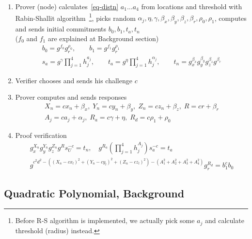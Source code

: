 \documentclass{article}
\begin{document}
\begin{enumerate}
	\item
	Prover (node) calculates~\eqref{eq-distn} $a_1 \dots a_4$ from locations and threshold
	with Rabin-Shallit algorithm~\footnote{Before R-S algorithm is implemented,
		we actually pick some $a_j$ and calculate threshold (radius) instead.},
	picks random $\alpha_j, \eta, \gamma, \beta_x, \beta_y, \beta_z, \beta_r, \rho_0, \rho_1$, %
	computes and sends initial commitments $b_0, b_1, t_a, t_n$ \\
	($f_0$ and $f_1$ are explained at Background section)
	\begin{gather}
	b_0 = g^{f_0} g_r^{\rho_0},   \qquad
	b_1 = g^{f_1} g_r^{\rho_1}    \\
	s_a = g^{\gamma} \prod_{j=1}^4 h_j^{a_j},   \qquad
	t_a = g^{\eta} \prod_{j=1}^4 h_j^{\alpha_j} ,   \qquad
	t_n = g_x^{\beta_x} g_y^{\beta_y} g_z^{\beta_z} g^{\beta_r}
	\end{gather}
	
	\item
	Verifier chooses and sends his challenge $c$
	\item
	Prover computes and sends responses
	\begin{gather}
	X_n = c x_n + \beta_x,  \;
	Y_n = c y_n + \beta_y,  \;
	Z_n = c z_n + \beta_z,   \;
	R = c r + \beta_r   \\
	A_j = c a_j + \alpha_j, \;
	R_a = c \gamma + \eta,   \;
	R_d = c \rho_1 + \rho_0
	\end{gather}
	
	\item
	Proof verification
	\begin{gather}
	\label{verf-linear}
	g_x^{X_n} g_y^{Y_n} g_z^{Z_n} g^{R} s_U^{-c} = t_n, \quad
	g^{R_a} (\prod_{j=1}^4 h_j^{A_j}) s_a^{-c} = t_a \\
	\label{verf-distn}
	g^{c^2 d^2 - ((X_n - c x_l)^2 + (Y_n - c y_l)^2 + (Z_n - c z_l)^2 ) - (A_1^2 + A_2^2 + A_3^2 + A_4^2)} g_r^{R_d} = b_1^{c} b_0
	\end{gather}
	
\end{enumerate}

\subsection{Quadratic Polynomial, Background}
\end{document}
